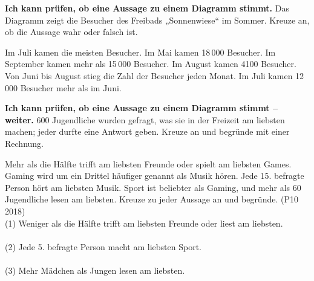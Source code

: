\begin{aufgabe}{\textbf{Ich kann prüfen, ob eine Aussage zu einem Diagramm stimmt.} Das Diagramm zeigt die Besucher des Freibads „Sonnenwiese“ im Sommer. Kreuze an, ob die Aussage wahr oder falsch ist.}


\begin{teile}
\teil Im Juli kamen die meisten Besucher. \hfill {}\quad{}
\teil Im Mai kamen 18\,000 Besucher. \hfill {}\quad{}
\teil Im September kamen mehr als 15\,000 Besucher. \hfill {}\quad{}
\teil Im August kamen 4100 Besucher. \hfill {}\quad{}
\teil Von Juni bis August stieg die Zahl der Besucher jeden Monat. \hfill {}\quad{}
\teil Im Juli kamen 12\,000 Besucher mehr als im Juni. \hfill {}\quad{}
\end{teile}
\end{aufgabe}

\begin{aufgabe}{\textbf{Ich kann prüfen, ob eine Aussage zu einem Diagramm stimmt – weiter.} 600 Jugendliche wurden gefragt, was sie in der Freizeit am liebsten machen; jeder durfte eine Antwort geben. Kreuze an und begründe mit einer Rechnung.}


\begin{teile}
\teil Mehr als die Hälfte trifft am liebsten Freunde oder spielt am liebsten Games. \hfill {}\quad{}
\teil Gaming wird um ein Drittel häufiger genannt als Musik hören. \hfill {}\quad{}
\teil Jede 15. befragte Person hört am liebsten Musik. \hfill {}\quad{}
\teil Sport ist beliebter als Gaming, und mehr als 60 Jugendliche lesen am liebsten. \hfill {}\quad{}
\teil Kreuze zu jeder Aussage an und begründe. (P10 2018)\\
(1) Weniger als die Hälfte trifft am liebsten Freunde oder liest am liebsten.\\ \quad{}\quad{}\\
(2) Jede 5. befragte Person macht am liebsten Sport.\\ \quad{}\quad{}\\
(3) Mehr Mädchen als Jungen lesen am liebsten.\\ \quad{}\quad{}
\end{teile}
\end{aufgabe}

